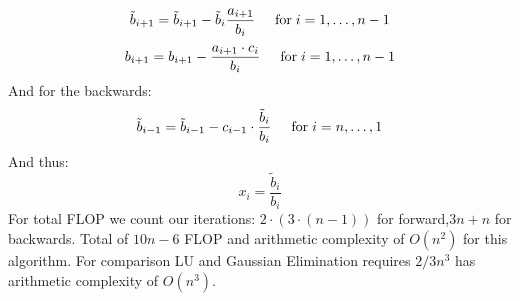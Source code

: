 \documentclass{article}
\begin{document}
\begin{enumerate}
 
\[
    \tilde{b}_{i+1}= \tilde{b}_{i+1} - \tilde{b}_{i}\frac{ a_{i+1}}{b_{i}} \hspace{0.5cm} \mathrm{for} \hspace{0.1cm} i=1,\dots, n-1
\]\[
     b_{i+1}=b_{i+1}-\frac{ a_{i+1}\cdot c_{i}}{b_{i}}  \hspace{0.5cm} \mathrm{for} \hspace{0.1cm} i=1,\dots, n-1
\]
And for the backwards:
\[
     \tilde{b}_{i-1}=\tilde{b}_{i-1}-c_{i-1}\cdot \frac{\tilde{b}_i}{b_i} \hspace{0.5cm} \mathrm{for} \hspace{0.1cm} i=n,\dots, 1
\]
And thus:
\[
x_i= \frac{\tilde{b}_i}{b_i}
\]
For total FLOP we count our iterations: $2\cdot(3\cdot (n-1))$ for forward,$3n+n$ for backwards. Total of $10n-6$ FLOP and arithmetic complexity of $O(n^2)$ for this algorithm. For comparison LU and Gaussian Elimination requires $2/3 n^3$ has arithmetic complexity of $O(n^3)$.
 

\end{enumerate}
\end{document}
